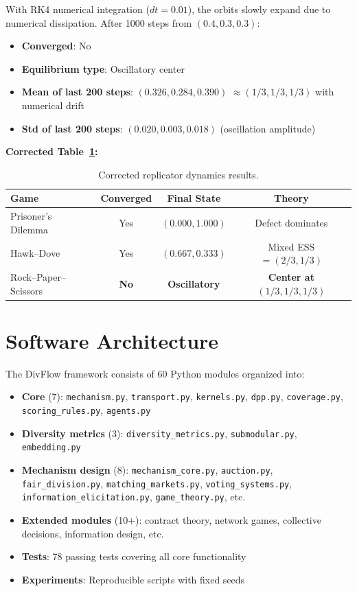 \documentclass[10pt]{article}
\begin{document}
With RK4 numerical integration ($dt = 0.01$), the orbits slowly expand due to numerical dissipation. After 1000 steps from $(0.4, 0.3, 0.3)$:
\begin{itemize}[leftmargin=*,itemsep=1pt]
\item \textbf{Converged}: No
\item \textbf{Equilibrium type}: Oscillatory center
\item \textbf{Mean of last 200 steps}: $(0.326, 0.284, 0.390)$ $\approx (1/3, 1/3, 1/3)$ with numerical drift
\item \textbf{Std of last 200 steps}: $(0.020, 0.003, 0.018)$ (oscillation amplitude)
\end{itemize}

\textbf{Corrected Table~\ref{tab:rps-corrected}:}

\begin{table}[H]
\centering
\caption{Corrected replicator dynamics results.}
\label{tab:rps-corrected}
\begin{tabular}{lccc}
\toprule
\textbf{Game} & \textbf{Converged} & \textbf{Final State} & \textbf{Theory} \\
\midrule
Prisoner's Dilemma & Yes & $(0.000, 1.000)$ & Defect dominates \\
Hawk--Dove & Yes & $(0.667, 0.333)$ & Mixed ESS $= (2/3, 1/3)$ \\
Rock--Paper--Scissors & \textbf{No} & \textbf{Oscillatory} & \textbf{Center at $(1/3, 1/3, 1/3)$} \\
\bottomrule
\end{tabular}
\end{table}

\section{Software Architecture}
\label{app:architecture}

The DivFlow framework consists of 60 Python modules organized into:

\begin{itemize}[leftmargin=*,itemsep=1pt]
\item \textbf{Core} (7): \texttt{mechanism.py}, \texttt{transport.py}, \texttt{kernels.py}, \texttt{dpp.py}, \texttt{coverage.py}, \texttt{scoring\_rules.py}, \linebreak \texttt{agents.py}
\item \textbf{Diversity metrics} (3): \texttt{diversity\_metrics.py}, \texttt{submodular.py}, \texttt{embedding.py}
\item \textbf{Mechanism design} (8): \texttt{mechanism\_core.py}, \texttt{auction.py}, \texttt{fair\_division.py}, \texttt{matching\_markets.py}, \texttt{voting\_systems.py}, \texttt{information\_elicitation.py}, \texttt{game\_theory.py}, etc.
\item \textbf{Extended modules} (10+): contract theory, network games, collective decisions, information design, etc.
\item \textbf{Tests}: 78 passing tests covering all core functionality
\item \textbf{Experiments}: Reproducible scripts with fixed seeds
\end{itemize}
\end{document}
